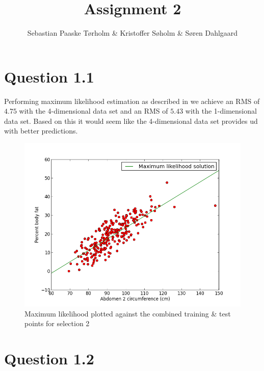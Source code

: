 \documentclass[11pt,a4paper]{article}
\title{Assignment 2}
\author{Sebastian Paaske Tørholm \& Kristoffer Søholm \& Søren Dahlgaard}
\begin{document}
\maketitle

\section{Question 1.1}
Performing maximum likelihood estimation as described in
\cite[sec. 3.1.1]{Bishop} we achieve an RMS of $4.75$ with the 4-dimensional
data set and an RMS of $5.43$ with the 1-dimensional data set. Based on this
it would seem like the 4-dimensional data set provides ud with better
predictions.

\begin{figure}[h!]
    \includegraphics[width=\textwidth]{images/prob11-sel2.png}
    \caption{Maximum likelihood plotted against the combined training \& test points for selection 2}
\end{figure}

\section{Question 1.2}

\end{document}
